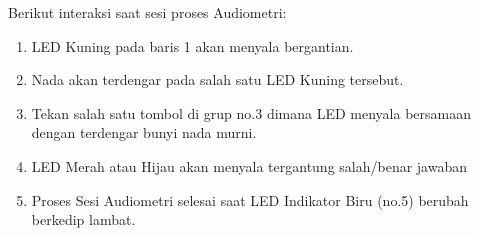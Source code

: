 \documentclass[12pt,]{article}
\begin{document}
	Berikut interaksi saat sesi proses Audiometri:
	\begin{enumerate}
		\item LED Kuning pada baris 1 akan menyala bergantian.
		\item Nada akan terdengar pada salah satu LED Kuning tersebut.
		\item Tekan salah satu tombol di grup no.3 dimana LED menyala bersamaan dengan terdengar bunyi nada murni.
		\item LED Merah atau Hijau akan menyala tergantung salah/benar jawaban
		\item Proses Sesi Audiometri selesai saat LED Indikator Biru (no.5) berubah berkedip lambat.
	\end{enumerate}
	
\end{document}

